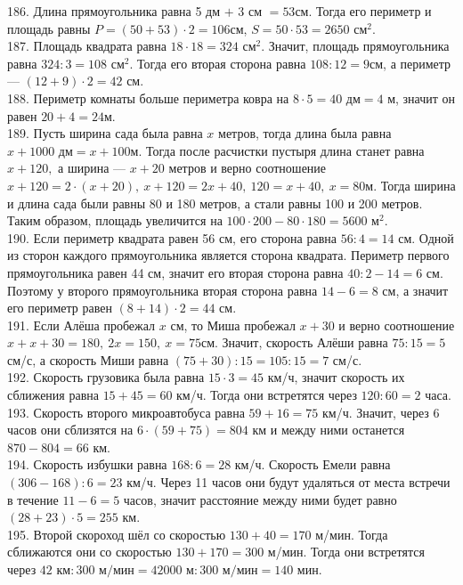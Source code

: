 186. Длина прямоугольника равна 5 дм $+$ 3 см $=53$см. Тогда его периметр и площадь равны $P=(50+53)\cdot2=106$см, $S=50\cdot53=2650\text{ см}^2.$\\
187. Площадь квадрата равна $18\cdot18=324\text{ см}^2.$ Значит, площадь прямоугольника равна $324:3=108\text{ см}^2.$ Тогда его вторая сторона равна $108:12=9$см, а периметр --- $(12+9)\cdot2=42$ см.\\
188. Периметр комнаты больше периметра ковра на $8\cdot5=40\text{ дм}=4$ м, значит он равен $20+4=24$м.\\
189. Пусть ширина сада была равна $x$ метров, тогда длина была равна $x+1000\text{ дм}=x+100$м. Тогда после расчистки пустыря длина станет равна $x+120,$ а ширина --- $x+20$ метров и верно соотношение $x+120=2\cdot(x+20),\ x+120=2x+40,\ 120=x+40,\ x=80$м. Тогда ширина и длина сада были равны 80 и 180 метров, а стали равны 100 и 200 метров. Таким образом, площадь увеличится на $100\cdot200-80\cdot180=5600\text{ м}^2.$\\
190. Если периметр квадрата равен 56 см, его сторона равна $56:4=14$ см. Одной из сторон каждого прямоугольника является сторона квадрата. Периметр первого прямоугольника равен 44 см, значит его вторая сторона равна $40:2-14=6$ см. Поэтому у второго прямоугольника вторая сторона равна $14-6=8$ см, а значит его периметр равен $(8+14)\cdot2=44$ см.\\
191. Если Алёша пробежал $x$ см, то Миша пробежал $x+30$ и верно соотношение $x+x+30=180,\ 2x=150,\ x=75$см. Значит, скорость Алёши равна $75:15=5$ см/с, а скорость Миши равна $(75+30):15=105:15=7$ см/с.\\
192. Скорость грузовика была равна $15\cdot3=45$ км/ч, значит скорость их сближения равна $15+45=60$ км/ч. Тогда они встретятся через $120:60=2$ часа.\\
193. Скорость второго микроавтобуса равна $59+16=75$ км/ч. Значит, через 6 часов они сблизятся на $6\cdot(59+75)=804$ км и между ними останется $870-804=66$ км.\\
194. Скорость избушки равна $168:6=28$ км/ч. Скорость Емели равна $(306-168):6=23$ км/ч. Через 11 часов они будут удаляться от места встречи в течение $11-6=5$ часов, значит расстояние между ними будет равно $(28+23)\cdot5=255$ км.\\
195. Второй скороход шёл со скоростью $130+40=170$ м/мин. Тогда сближаются они со скоростью $130+170=300$ м/мин. Тогда они встретятся через $42\text{ км}:300\text{ м/мин}=42000\text{ м}:300\text{ м/мин}=140\text{ мин.}$\\
